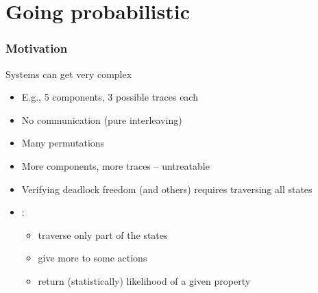 \documentclass[aspectratio=169]{beamer}
\begin{document}
\section{Going probabilistic}

\begin{frame}[t]\frametitle{Motivation}
  \begin{block}{Systems can get very complex}
    \begin{itemize}
      \item E.g., 5 components, 3 possible traces each
      \item No communication (pure interleaving)
      \item Many permutations
      \pause
      \item More components, more traces -- untreatable
      \\[5mm]
      \pause
      \item Verifying deadlock freedom (and others) requires traversing all states
      \item {}:
      \begin{itemize}
        \item traverse only part of the states
        \item give more  to some actions
        \item return (statistically) likelihood of a given property
      \end{itemize}
    \end{itemize}
  \end{block}
\end{frame}
\end{document}
